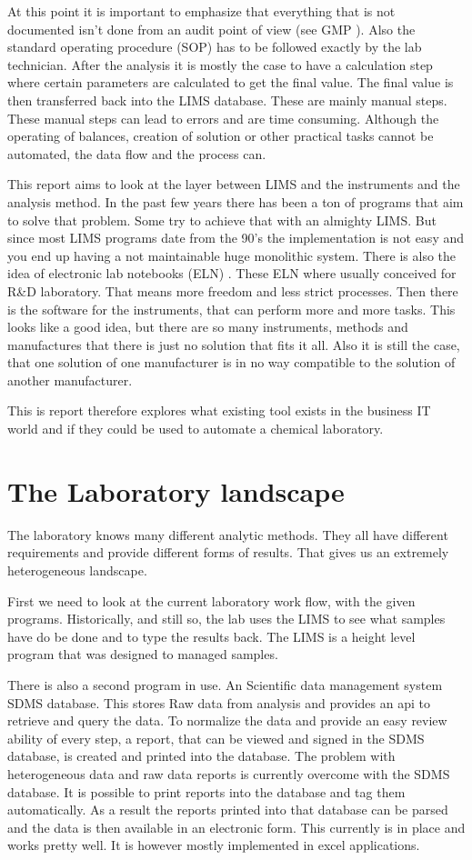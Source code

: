 \documentclass[paper=a4,twoside=false,BCOR=0mm,DIV=calc,fontsize=12pt]{scrartcl}
\begin{document}
At this point it is important to emphasize that everything that is not documented isn't done from an audit point of view (see GMP \cite{gmp}). Also the standard operating procedure (SOP) has to be followed exactly by the lab technician.
After the analysis it is mostly the case to have a calculation step where certain parameters are calculated to get the final value. The final value is then transferred back into the LIMS database. These are mainly manual steps. These manual steps can lead to errors and are time consuming.
Although the operating of balances, creation of solution or other practical tasks cannot be automated, the data flow and the process can.

This report aims to look at the layer between LIMS and the instruments and the analysis method. In the past few years there has been a ton of programs that aim to solve that problem. Some try to achieve that with an almighty LIMS. But since most LIMS programs date from the 90's the implementation is not easy and you end up having a not maintainable huge monolithic system. There is also the idea of electronic lab notebooks (ELN) \cite{eln}. These ELN where usually conceived for R\&D laboratory. That means more freedom and less strict processes.
Then there is the software for the instruments, that can perform more and more tasks. This looks like a good idea, but there are so many instruments, methods and manufactures that there is just no solution that fits it all. Also it is still the case, that one solution of one manufacturer is in no way compatible to the solution of another manufacturer.

This is report therefore explores what existing tool exists in the business IT world and if they could be used to automate a chemical laboratory.

\section{The Laboratory landscape}
The laboratory knows many different analytic methods. They all have different requirements and provide different forms of results. That gives us an extremely heterogeneous landscape. 

First we need to look at the current laboratory work flow, with the given programs. Historically, and still so, the lab uses the LIMS to see what samples have do be done and to type the results back. The LIMS is a height level program that was designed to managed samples.

There is also a second program in use. An Scientific data management system SDMS \cite{sdms} database. This stores Raw data from analysis and provides an api to retrieve and query the data.
To normalize the data and provide an easy review ability of every step, a report, that can be viewed and signed in the SDMS database, is created and printed into the database.
The problem with heterogeneous data and raw data reports is currently overcome with the SDMS database. It is possible to print reports into the database and tag them automatically. As a result the reports printed into that database can be parsed and the data is then available in an electronic form. This currently is in place and works pretty well.
It is however mostly implemented in excel \cite{excel} applications.
\end{document}
